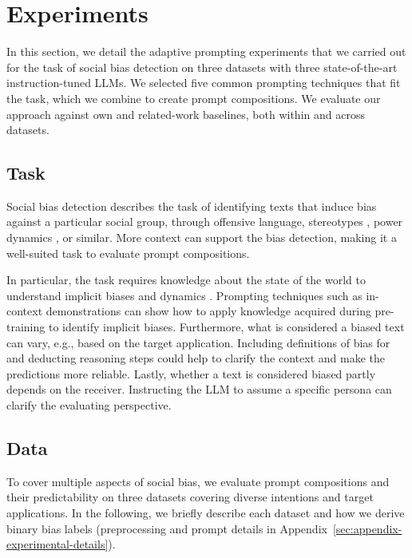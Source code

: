 \section{Experiments}
\label{sec:experiments}

In this section, we detail the adaptive prompting experiments that we carried out for the task of social bias detection on three datasets with three state-of-the-art instruction-tuned LLMs. We selected five common prompting techniques that fit the task, which we combine to create prompt compositions. We evaluate our approach against own and related-work baselines, both within and across datasets.



\subsection{Task}
Social bias detection describes the task of identifying texts that induce bias against a particular social group, through offensive language, stereotypes \cite{nadeem2021}, power dynamics \cite{sap2020,zhou2023a}, or similar. More context can support the bias detection, making it a well-suited task to evaluate prompt compositions.

In particular, the task requires knowledge about the state of the world to understand implicit biases and dynamics \cite{hovy2021,zhou2023a}. Prompting techniques such as in-context demonstrations can show how to apply knowledge acquired during pre-training to identify implicit biases. Furthermore, what is considered a biased text can vary, e.g., based on the target application. Including definitions of bias for and deducting reasoning steps could help to clarify the context and make the predictions more reliable. Lastly, whether a text is considered biased partly depends on the receiver. Instructing the LLM to assume a specific persona can clarify the evaluating perspective.



\subsection{Data}
\label{sec:experiments:data-llms}
To cover multiple aspects of social bias, we evaluate prompt compositions and their predictability on three datasets covering diverse intentions and target applications. In the following, we briefly describe each dataset and how we derive binary bias labels (preprocessing and prompt details in Appendix~\ref{sec:appendix-experimental-details}).


